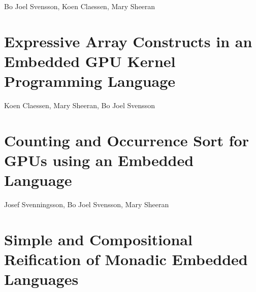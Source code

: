 \documentclass[a4paper]{book}
\begin{document}
\begin{center} 
Bo Joel Svensson, Koen Claessen, Mary Sheeran
\end{center}




% 
\cleardoublepage 

\section{Expressive Array Constructs in an Embedded GPU Kernel Programming Language}

\begin{center} 
Koen Claessen, Mary Sheeran, Bo Joel Svensson
\end{center}



% 
\cleardoublepage 

\section{Counting and Occurrence Sort for GPUs using an Embedded Language}

\begin{center} 
Josef Svenningsson, Bo Joel Svensson, Mary Sheeran 
\end{center}




% 
\cleardoublepage 


\section{Simple and Compositional Reification of Monadic Embedded Languages}
\end{document}
